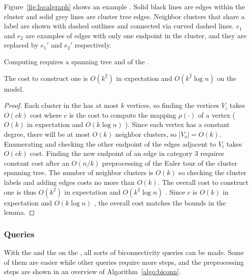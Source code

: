 Figure~\ref{fig:localgraph} shows an example \localgraph{}.
Solid black lines are edges within the cluster and solid grey lines are cluster tree edges.  Neighbor clusters that share a label are shown with dashed outlines and connected via curved dashed lines.  $e_1$ and $e_2$ are examples of edges with only one endpoint in the cluster, and they are replaced by $e_1'$ and $e_2'$ respectively.

Computing  requires a spanning tree and \imprep{} of the \clustergraph{}.

\begin{lemma}\label{lem:locgraph-cons}
The cost to construct one \localgraph{} is $O(k^2)$ in expectation and $O(k^2\log n)$ \whp{} on the \seqmodel{} model.
\end{lemma}
\begin{proof}
Each cluster in the \implicit{} has at most $k$ vertices, so finding the vertices $V_i$ takes $O(ck)$ cost where $c$ is the cost to compute the mapping $\rho(\cdot)$ of a vertex ($O(k)$ in expectation and $O(k\log n)$ \whp{}).  Since each vertex has a constant degree, there will be at most $O(k)$ neighbor clusters, so $|V_o|=O(k)$.   Enumerating and checking the other endpoint of the edges adjacent to $V_i$ takes $O(ck)$ cost.  Finding the new endpoint of an edge in category 3 requires constant cost after an $O(n/k)$ preprocessing of the Euler tour of the cluster spanning tree.  The number of neighbor clusters is $O(k)$ so checking the cluster labels and adding edges costs no more than $O(k)$.
The overall cost to construct one \localgraph{} is thus $O(k^2)$ in expectation and $O(k^2\log n)$ \whp{}.
Since $c$ is $O(k)$ in expectation and $O(k\log n)$ \whp{}, the overall cost matches the bounds in the lemma.
\end{proof}

\subsubsection{Queries}

With the \localgraph{} and the \imprep{} on the \clustergraph{}, all sorts of biconnectivity queries can be made.
Some of them are easier while other queries require more steps, and the preprocessing steps are shown in an overview of Algorithm~\ref{algo:biconn}.

